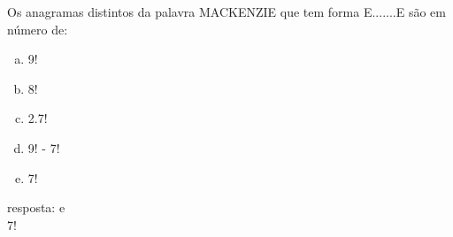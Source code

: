 \begin{ex}
 Os anagramas distintos da palavra MACKENZIE que tem forma E.......E são em número de:
    \begin{enumerate}[(a)]
    \item 9!
    \item 8!
    \item 2.7!
    \item 9! - 7!
    \item 7!
    \end{enumerate}
      \begin{sol}
      resposta: e \\
      7!
      \end{sol}
\end{ex}